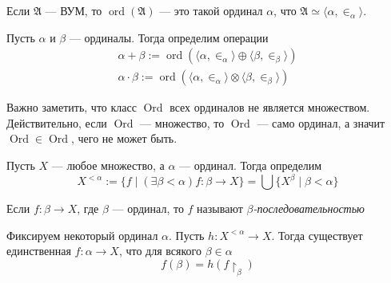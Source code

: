 \documentclass[12pt,a4paper]{article}
\DeclareMathOperator{\ord}{ord}
\DeclareMathOperator{\Ord}{Ord}
\begin{document}
    \begin{definition}
        Если $\mathfrak{A}$ --- ВУМ, то $\ord(\mathfrak{A})$ --- это такой ординал $\alpha$, что $\mathfrak{A} \simeq \langle \alpha, {\in}_\alpha \rangle$.
    \end{definition}

    \begin{definition}
        Пусть $\alpha$ и $\beta$ --- ординалы. Тогда определим операции
        \begin{gather*}
            \alpha + \beta := \ord(\langle \alpha, {\in}_\alpha \rangle \oplus \langle \beta, {\in}_\beta \rangle)\\
            \alpha \cdot \beta := \ord(\langle \alpha, {\in}_\alpha \rangle \otimes \langle \beta, {\in}_\beta \rangle)
        \end{gather*}
    \end{definition}

    \begin{remark}
        Важно заметить, что класс $\Ord$ всех ординалов не является множеством. Действительно, если $\Ord$ --- множество, то $\Ord$ --- само ординал, а значит $\Ord \in \Ord$, чего не может быть.
    \end{remark}

    \begin{definition}
        Пусть $X$ --- любое множество, а $\alpha$ --- ординал. Тогда определим
        \[X^{<\alpha} := \{f \mid (\exists \beta < \alpha) f: \beta \to X\} = \bigcup \{X^\beta \mid \beta < \alpha\}\]
    \end{definition}

    \begin{definition}
        Если $f: \beta \to X$, где $\beta$ --- ординал, то $f$ называют \emph{$\beta$-последовательностью}
    \end{definition}

    \begin{theorem}
        Фиксируем некоторый ординал $\alpha$. Пусть $h: X^{<\alpha} \to X$. Тогда существует единственная $f: \alpha \to X$, что для всякого $\beta \in \alpha$
        \[f(\beta) = h(f \upharpoonright_\beta)\]
    \end{theorem}
\end{document}
